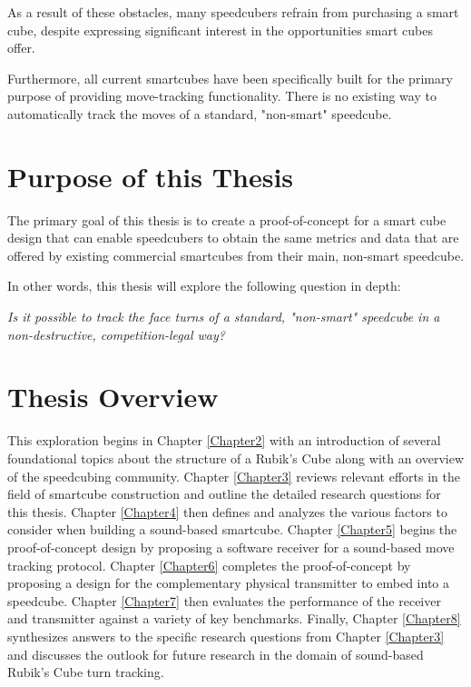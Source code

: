 As a result of these obstacles, many speedcubers refrain from
purchasing a smart cube, despite expressing significant interest in the
opportunities smart cubes offer.

Furthermore, all current smartcubes have been specifically built for
the primary purpose of providing move-tracking functionality. There is
no existing way to automatically track the moves of a standard,
"non-smart" speedcube.


\section{Purpose of this Thesis}
\label{sec:thesis-purpose}

The primary goal of this thesis is to create a proof-of-concept for a
smart cube design that can enable speedcubers to obtain the same
metrics and data that are offered by existing commercial smartcubes
from their main, non-smart speedcube.

In other words, this thesis will explore the following question in depth:

\emph{Is it possible to track the face turns of a standard, "non-smart"
speedcube in a non-destructive, competition-legal way?}


\section{Thesis Overview}
\label{sec:thesis-overview}

This exploration begins in Chapter \ref{Chapter2} with an introduction
of several foundational topics about the structure of a Rubik's Cube
along with an overview of the speedcubing community. Chapter
\ref{Chapter3} reviews relevant efforts in the field of smartcube
construction and outline the detailed research questions for this
thesis. Chapter \ref{Chapter4} then defines and analyzes the various
factors to consider when building a sound-based smartcube. Chapter
\ref{Chapter5} begins the proof-of-concept design by proposing a
software receiver for a sound-based move tracking protocol. Chapter
\ref{Chapter6} completes the proof-of-concept by proposing a design for
the complementary physical transmitter to embed into a speedcube.
Chapter \ref{Chapter7} then evaluates the performance of the receiver
and transmitter against a variety of key benchmarks. Finally, Chapter
\ref{Chapter8} synthesizes answers to the specific research questions
from Chapter \ref{Chapter3} and discusses the outlook for future
research in the domain of sound-based Rubik's Cube turn tracking.
